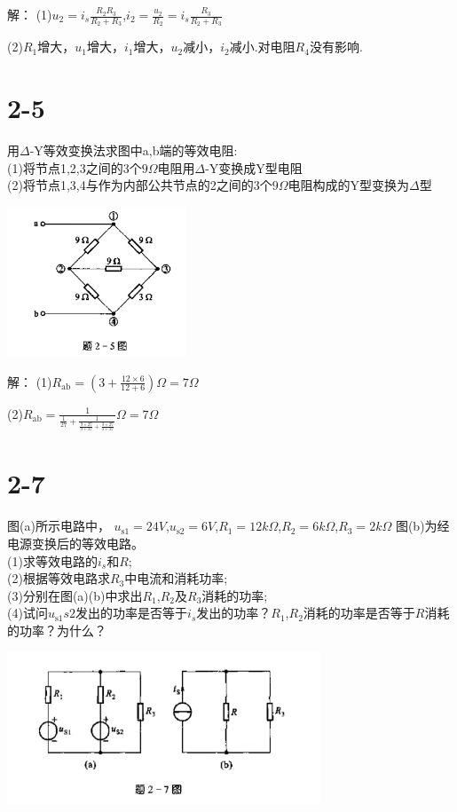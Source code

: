 \documentclass{article}
\begin{document}
\noindent 解：
(1)$u_2=i_s\frac{R_2R_3}{R_2+R_3}$,$i_2=\frac{u_2}{R_2}=i_s\frac{R_3}{R_2+R_3}$

(2)$R_1$增大，$u_1$增大，$i_1$增大，$u_2$减小，$i_2$减小.对电阻$R_4$没有影响.
\section*{2-5}
用$\Delta$-Y等效变换法求图中a,b端的等效电阻:\\
(1)将节点1,2,3之间的3个$9\Omega$电阻用$\Delta$-Y变换成Y型电阻\\
(2)将节点1,3,4与作为内部公共节点的2之间的3个$9\Omega$电阻构成的Y型变换为$\Delta$型\\
\begin{center}
\includegraphics[width=0.4\textwidth,height=0.2\textheight]{2-5.jpg}
\end{center}

\noindent 解：
(1)$R_\text{ab}=(3+\frac{12\times6}{12+6})\Omega=7\Omega$


(2)\(R_\text{ab}=\frac{1}{\frac{1}{27}+\frac{1}{\frac{9\times27}{9+27}+\frac{3\times27}{3+27}}}\Omega=7\Omega\)
\section*{2-7}图(a)所示电路中，
$u_\text{s1}=24V$,$u_\text{s2}=6V$,$R_1=12k\Omega$,$R_2=6k\Omega$,$R_3=2k\Omega$
图(b)为经电源变换后的等效电路。\\
(1)求等效电路的$i_s$和$R$;\\(2)根据等效电路求$R_3$中电流和消耗功率;
\\(3)分别在图(a)(b)中求出$R_1$,$R_2$及$R_3$消耗的功率;
\\(4)试问$u_\text{s1}{s2}$发出的功率是否等于$i_s$发出的功率？$R_1$,$R_2$消耗的功率是否等于$R$消耗的功率？为什么？
\begin{center}
\includegraphics[width=0.7\textwidth,height=0.2\textheight]{2-7.jpg}
\end{center}
\end{document}
